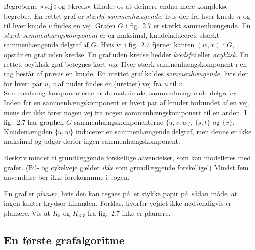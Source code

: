Begreberne »vej« og »kreds« tillader os at definere endnu mere komplekse begreber.
En rettet graf er \emph{stærkt sammenhængende}, hvis der fra hver knude $u$ og til hver knude $v$ findes en vej.
Grafen $G$ i fig.~2.7 er stærkt sammenhængende.
En \emph{stærk sammenhængskomponent} er en maksimal, knudeinduceret, stærkt sammenhængende delgraf af $G$.
Hvis vi i fig.~2.7 fjerner kanten $(w,x)$ i $G$, opstår en graf uden kredse.
En graf uden kredse hedder \emph{kredsfri} eller \emph{acyklisk}.
En rettet, acyklisk graf betegnes kort \emph{rag}.
Hver stærk sammenhængskomponent i en rag består af præcis en knude.
En urettet graf kaldes \emph{sammenhængende}, hvis der for hvert par $u$, $v$ af nuder findes en (urettet) vej fra $u$ til $v$.
Sammenhængskomponenterne er de maksimale, sammenhængdende delgrafer.
Inden for en sammenhængskomponent er hvert par af knuder forbundet af en vej, mens der ikke fører nogen vej fra nogen sammenhængskomponent til en anden.
I fig.~2.7 har graphen $G$ sammenhængskomponenterne $\{u,v,w\}$, $\{s,t\}$ og $\{x\}$.
Knudemængden $\{u,w\}$ inducerer en sammenhængende delgraf, men denne er ikke maksimal og udgør derfor ingen sammenhængskomponent.

\begin{exerc}
Beskriv mindst ti grundlæggende forskellige anvendelser, som kan modelleres med grafer.
(Bil- og cykelveje gælder \emph{ikke} som grundlæggende forskellige!)
Mindst fem anvendelse bør ikke forekommme i bogen.
\end{exerc}

\begin{exerc}
En graf er \emph{planær}, hvis den kan tegnes på et stykke papir på sådan måde, at ingen kanter krydser hinanden.
Forklar, hvorfor vejnet ikke nødvendigvis er planære.
Vis at $K_5$ og $K_{3,3}$ fra fig.~2.7 ikke er planære.
\end{exerc}

\subsection{En første grafalgoritme}

